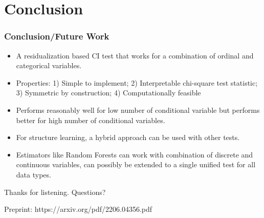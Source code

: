 \documentclass{beamer}
\begin{document}
\section{Conclusion}
\begin{frame}
	\frametitle{Conclusion/Future Work}
	\begin{itemize}
		\setlength\itemsep{1em}
		\item A residualization based CI test that works for a
			combination of ordinal and categorical variables.
		\item Properties: 1) Simple to implement; 2) Interpretable
			chi-square test statistic; 3) Symmetric by
			construction; 4) Computationally feasible
		\item Performs reasonably well for low number of conditional
			variable but performs better for high number of
			conditional variables.
		\item For structure learning, a hybrid approach can be used
			with other tests.
		\item Estimators like Random Forests can work with combination
			of discrete and continuous variables, can possibly be
			extended to a single unified test for all data types.
	\end{itemize}
\end{frame}

\begin{frame}
	\begin{center}
		\Huge{Thanks for listening. Questions?}
	\end{center}
	\begin{center}
		Preprint: https://arxiv.org/pdf/2206.04356.pdf
	\end{center}
\end{frame}
\end{document}
